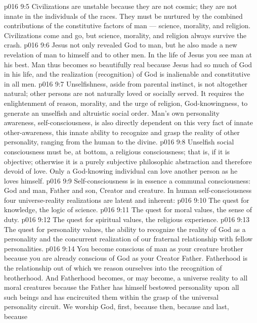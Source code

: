 \vs p016 9:5 Civilizations are unstable because they are not cosmic; they are not innate in the individuals of the races. They must be nurtured by the combined contributions of the constitutive factors of man --- science, morality, and religion. Civilizations come and go, but science, morality, and religion always survive the crash.
\vs p016 9:6 Jesus not only revealed God to man, but he also made a new revelation of man to himself and to other men. In the life of Jesus you see man at his best. Man thus becomes so beautifully real because Jesus had so much of God in his life, and the realization (recognition) of God is inalienable and constitutive in all men.
\vs p016 9:7 \pc Unselfishness, aside from parental instinct, is not altogether natural; other persons are not naturally loved or socially served. It requires the enlightenment of reason, morality, and the urge of religion, God\hyp{}knowingness, to generate an unselfish and altruistic social order. Man’s own personality awareness, self\hyp{}consciousness, is also directly dependent on this very fact of innate other\hyp{}awareness, this innate ability to recognize and grasp the reality of other personality, ranging from the human to the divine.
\vs p016 9:8 Unselfish social consciousness must be, at bottom, a religious consciousness; that is, if it is objective; otherwise it is a purely subjective philosophic abstraction and therefore devoid of love. Only a God\hyp{}knowing individual can love another person as he loves himself.
\vs p016 9:9 Self\hyp{}consciousness is in essence a communal consciousness: God and man, Father and son, Creator and creature. In human self\hyp{}consciousness four universe\hyp{}reality realizations are latent and inherent:
\vs p016 9:10 \bibnobreakspace The quest for knowledge, the logic of science.
\vs p016 9:11 \bibnobreakspace The quest for moral values, the sense of duty.
\vs p016 9:12 \bibnobreakspace The quest for spiritual values, the religious experience.
\vs p016 9:13 \bibnobreakspace The quest for personality values, the ability to recognize the reality of God as a personality and the concurrent realization of our fraternal relationship with fellow personalities.
\vs p016 9:14 \pc You become conscious of man as your creature brother because you are already conscious of God as your Creator Father. Fatherhood is the relationship out of which we reason ourselves into the recognition of brotherhood. And Fatherhood becomes, or may become, a universe reality to all moral creatures because the Father has himself bestowed personality upon all such beings and has encircuited them within the grasp of the universal personality circuit. We worship God, first, because  then, because  and last, because 
